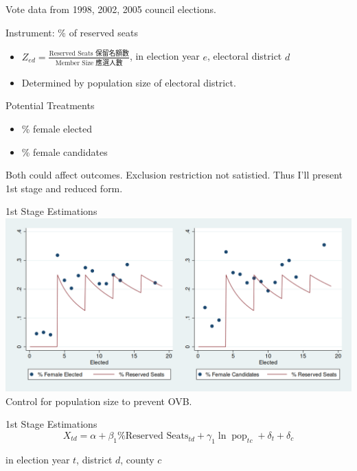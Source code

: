 \documentclass[
  10pt,
  ignorenonframetext,
  aspectratio=43,
]{beamer}
\providecommand{\tightlist}{%
  \setlength{\itemsep}{0pt}\setlength{\parskip}{0pt}}
\begin{document}
\begin{frame}
Vote data from 1998, 2002, 2005 council elections.

\begin{block}{Instrument: \% of reserved seats}
\protect\hypertarget{instrument-of-reserved-seats}{}
\begin{itemize}
\tightlist
\item
  \(Z_{ed} = \frac{\text{Reserved Seats 保留名額數}}{\text{Member Size 應選人數}}\),
  in election year \(e\), electoral district \(d\)
\item
  Determined by population size of electoral district.
\end{itemize}
\end{block}

\begin{block}{Potential Treatments}
\protect\hypertarget{potential-treatments}{}
\begin{itemize}
\tightlist
\item
  \% female elected
\item
  \% female candidates
\end{itemize}

Both could affect outcomes. Exclusion restriction not satistied. Thus
I'll present 1st stage and reduced form.
\end{block}
\end{frame}

\begin{frame}{1st Stage Estimations}
\protect\hypertarget{st-stage-estimations}{}
\includegraphics{graphs/firstStage.png}\\

Control for population size to prevent OVB.
\end{frame}

\begin{frame}
\begin{block}{1st Stage Estimations}
\protect\hypertarget{st-stage-estimations-1}{}
\[
X_{td} = \alpha + \beta_1 \text{\% Reserved Seats}_{td}  + \gamma_1 \ln \operatorname{pop}_{tc} + \delta_t + \delta_{c}
\]

in election year \(t\), district \(d\), county \(c\)
\end{block}
\end{frame}
\end{document}

